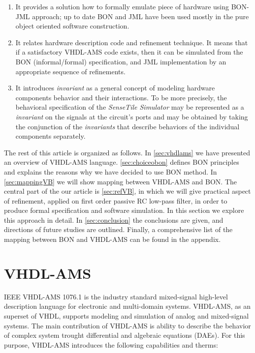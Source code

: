\documentclass{article}
\newcommand{\STS}{\emph{SenseTile Simulator}\xspace}
\newcommand{\inv}{\emph{invariant}\xspace}
\begin{document}
\begin{enumerate}
\item
 It provides a solution how to formally emulate
 piece of hardware using BON-JML approach; up to date BON and JML
 have been used mostly in the pure object oriented software construction.   
\item
It relates hardware description code and refinement technique.
It means that if a satisfactory VHDL-AMS code exists, then it can be simulated  from the 
BON (informal/formal) specification, and JML implementation by an 
appropriate sequence of refinements.
\item
It introduces \inv as a general concept of modeling hardware 
components behavior and their interactions.
To be more precisely, the behavioral specification of the \STS may 
be represented as a \inv on the signals at the circuit's ports and 
may be obtained by taking the conjunction of the \emph{invariants} 
that describe behaviors of the individual components separately.\\ 
\end{enumerate}
The rest of this article is organized as follows.
In \autoref{sec:vhdlams} we have  presented an overview of VHDL-AMS language.
\autoref{sec:choiceobon} defines  BON principles and explains the
reasons why we have decided to use BON method.
In \autoref{sec:mappingVB} we will show mapping between VHDL-AMS and BON. 
The central part of the our article is \autoref{sec:refVB}, in which
we will give practical aspect of refinement, applied on 
first order passive RC low-pass filter, in order to produce formal 
specification and software simulation. In this section we 
explore this approach in detail.
In \autoref{sec:conclusion} the conclusions are given,
and directions of future studies are outlined. Finally, a comprehensive list 
of the mapping between BON and VHDL-AMS can be found in the appendix. \\ 


\section{VHDL-AMS}
\label{sec:vhdlams}
IEEE VHDL-AMS 1076.1 is the industry standard mixed-signal
high-level description language for electronic and multi-domain
systems. VHDL-AMS, as an superset of VHDL, supports modeling and
simulation of analog and mixed-signal systems. The main contribution
of VHDL-AMS is ability to describe the behavior of complex system
trought differential and algebraic equations (DAEs). For this purpose,
VHDL-AMS introduces the following capabilities and therms:
\end{document}
